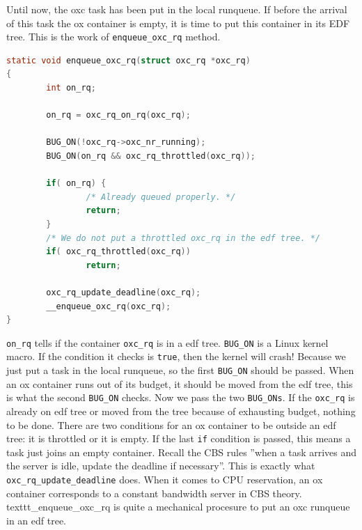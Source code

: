 Until now, the oxc task has been put in the local runqueue. 
If before the arrival of this task the ox container is empty, it
is time to put this container in its EDF tree.
This is the work of \texttt{enqueue\_oxc\_rq} method. 
\begin{lstlisting}[language=C, caption={Put an ox container in the EDF tree}]
static void enqueue_oxc_rq(struct oxc_rq *oxc_rq)
{
        int on_rq;

        on_rq = oxc_rq_on_rq(oxc_rq);

        BUG_ON(!oxc_rq->oxc_nr_running);
        BUG_ON(on_rq && oxc_rq_throttled(oxc_rq));

        if( on_rq) {
                /* Already queued properly. */
                return;
        }
        /* We do not put a throttled oxc_rq in the edf tree. */
        if( oxc_rq_throttled(oxc_rq))
                return;

        oxc_rq_update_deadline(oxc_rq);
        __enqueue_oxc_rq(oxc_rq);
}
\end{lstlisting}
\texttt{on\_rq} tells if the container \texttt{oxc\_rq} is in a edf tree.
\texttt{BUG\_ON} is a Linux kernel macro. If the condition it checks is 
\texttt{true}, then the kernel will crash! Because we just put a task
in the local runqueue, so the first \texttt{BUG\_ON} should be passed.
When an ox container runs out of its budget, it should be moved from the
edf tree, this is what the second \texttt{BUG\_ON} checks. Now we pass
the two \texttt{BUG\_ONs}. If the \texttt{oxc\_rq} is already on edf 
tree or moved from the tree because of exhausting budget, nothing to
be done. There are two conditions for an ox container to be outside an 
edf tree: it is throttled or it is empty. If the last \texttt{if}
condition is passed, this means a task just joins
an empty container. Recall the CBS rules ''when a task arrives and 
the server is idle, update the deadline if necessary''. This is exactly what
\texttt{oxc\_rq\_update\_deadline} does. When it comes to CPU reservation,
an ox container corresponds to a constant bandwidth server in CBS theory.
texttt{\_enqueue\_oxc\_rq} is quite a mechanical procesure to put an
oxc runqueue in an edf tree.

